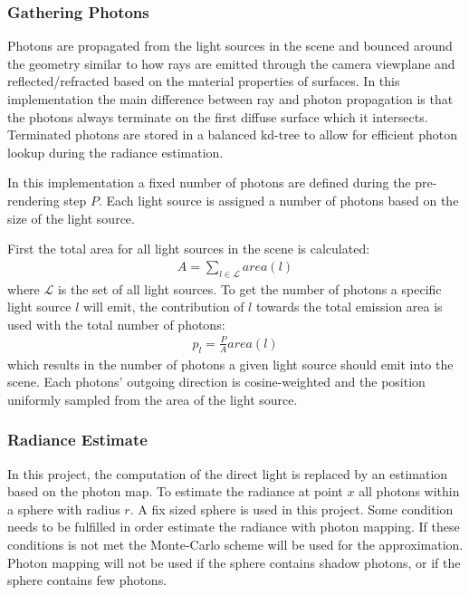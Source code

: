 \documentclass[a4paper, twocolumn]{article}
\begin{document}
            \subsubsection{Gathering Photons} \label{sec:gathering_photons}

            Photons are propagated from the light sources in the scene and bounced around the geometry similar to how rays are emitted through the camera viewplane and reflected/refracted based on the material properties of surfaces. In this implementation the main difference between ray and photon propagation is that the photons always terminate on the first diffuse surface which it intersects. Terminated photons are stored in a balanced kd-tree to allow for efficient photon lookup during the radiance estimation. 

            In this implementation a fixed number of photons are defined during the pre-rendering step \(P\). Each light source is assigned a number of photons based on the size of the light source.

            First the total area for all light sources in the scene is calculated: 
            \begin{align*}
            A = \sum_{l \in \mathcal{L}}{area(l)}
            \end{align*}
            where \(\mathcal{L}\) is the set of all light sources. To get the number of photons a specific light source \(l\) will emit, the contribution of \(l\) towards the total emission area is used with the total number of photons:
            \begin{align*}
            p_l = \frac{P}{A}area(l)
            \end{align*}
            which results in the number of photons a given light source should emit into the scene. Each photons' outgoing direction is cosine-weighted and the position uniformly sampled from the area of the light source. 

            \subsubsection{Radiance Estimate} \label{sec:radiance_estimate}
            In this project, the computation of the direct light is replaced by an estimation based on the photon map. To estimate the radiance at point $x$ all photons within a sphere with radius $r$. A fix sized sphere is used in this project. Some condition needs to be fulfilled in order estimate the radiance with photon mapping. If these conditions is not met the Monte-Carlo scheme will be used for the approximation. Photon mapping will not be used if the sphere contains shadow photons, or if the sphere contains few photons.
\end{document}
